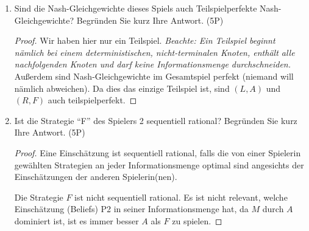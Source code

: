 \documentclass[12pt]{article}
\begin{document}
\begin{enumerate}[label=\alph*\upshape)]
\begin{proof}
			\textit{Hier bin ich mir nicht sicher, ob man nur in reinen Strategien untersuchen sollte.} Tipp: die Suche nach Nash-Gleichgewichten in gemischten Strategien für drei Strategien ist schwierig und dauert lang. Oft Mals kann man allerdings eine der drei Strategien vorab ausschließen. ~\smallskip
			
			Da $M$ strikt dominiert ist durch $R$, folgt analog wie in Aufgabe 1 c), dass $M$ in keinem Gleichgewicht vorkommen kann. Angenommen P1 spielt mit Wahrscheinlichkeit $p \in (0, 1)$ die Strategie $L$ und mit $(1-p)$ die Strategie $R$. Für ein Nash-Gleichgewicht müsste der erwartete Nutzen für P2 ausgeglichen sein, d.h.
			\begin{align*}
				\mathbb{E}[u(A)] & \overset{!}{=} \mathbb{E}[u(F)] \\
				\iff 1 \cdot p +  3 \cdot (1-p) & = 0 \cdot p + 3 \cdot (1-p) \iff p = 0,
			\end{align*}
			was einen Widerspruch darstellt. Es existiert also kein Nash-Gleichgewicht in (echt) gemischten Strategien und $(L,A)$ und $(R, F)$ sind damit die einzigen Gleichgewichte. ~\smallskip
			
			\textit{Auch hier gibt es wieder ein kurzes Argument: $A$ dominiert nämlich die Strategie $F$ schwach. Würde P1 eine echte Mischung auf $L$ und $R$ spielen, wird P2 stets $A$ wählen wollen, worauf $P1$ allerdings lieber rein $L$ spielt. Das heißt es kann kein Gleichgewicht in gemischten Strategien geben. Falls dies nicht ganz klar ist, einfach wie oben kurz per Hand nachrechnen.}
		\end{proof}
	\item Sind die Nash-Gleichgewichte dieses Spiels auch Teilspielperfekte Nash-Gleichgewichte? Begründen Sie kurz Ihre Antwort. (5P)
		\begin{proof}
			Wir haben hier nur ein Teilspiel. \textit{Beachte: Ein Teilspiel beginnt nämlich bei einem deterministischen, nicht-terminalen Knoten, enthält alle nachfolgenden Knoten und darf keine Informationsmenge durchschneiden.} Außerdem sind Nash-Gleichgewichte im Gesamtspiel perfekt (niemand will nämlich abweichen). Da dies das einzige Teilspiel ist, sind $(L,A)$ und $(R, F)$ auch teilspielperfekt. 
		\end{proof}
	\item Ist die Strategie \enquote{F} des Spielers 2 sequentiell rational? Begründen Sie kurz Ihre Antwort. (5P)
		\begin{proof}
			Eine Einschätzung ist sequentiell rational, falls die von einer Spielerin gewählten Strategien an jeder Informationsmenge optimal sind angesichts der Einschätzungen der anderen Spielerin(nen). ~\smallskip
			
			Die Strategie $F$ ist nicht sequentiell rational. Es ist nicht relevant, welche Einschätzung (Beliefs) P2 in seiner Informationsmenge hat, da $M$ durch $A$ dominiert ist, ist es immer besser $A$ als $F$ zu spielen.
		\end{proof}
\end{enumerate}
\end{document}
